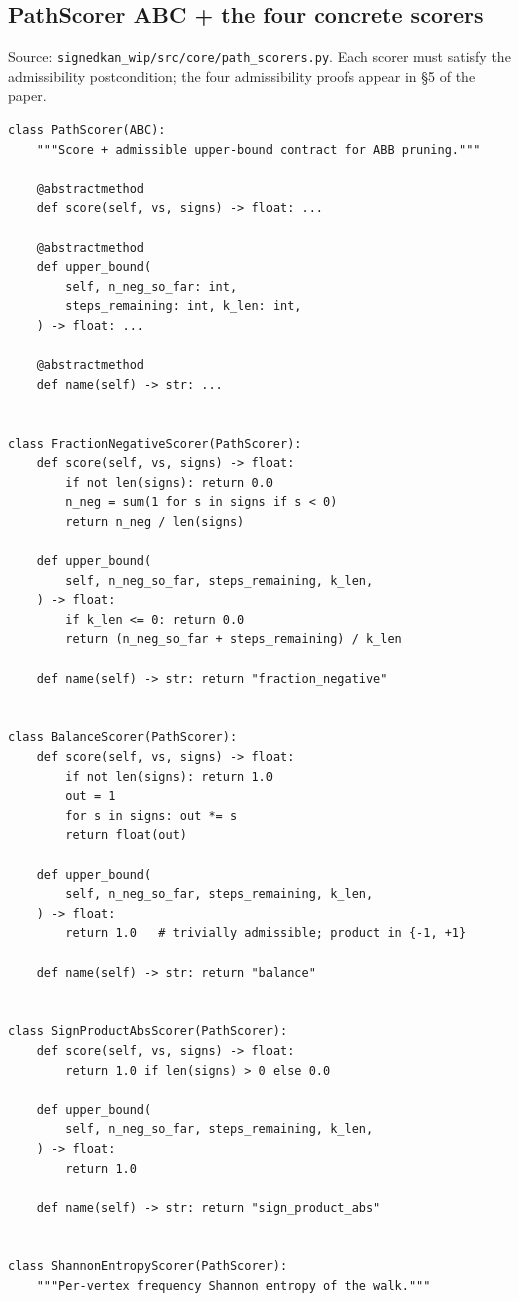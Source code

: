 \documentclass[11pt]{article}
\begin{document}
\subsection{PathScorer ABC + the four concrete scorers}
\label{app:code-scorers}

Source: \texttt{signedkan\_wip/src/core/path\_scorers.py}. Each
scorer must satisfy the admissibility postcondition; the four
admissibility proofs appear in \S5 of the paper.

\begin{lstlisting}[style=pythonstyle]
class PathScorer(ABC):
    """Score + admissible upper-bound contract for ABB pruning."""

    @abstractmethod
    def score(self, vs, signs) -> float: ...

    @abstractmethod
    def upper_bound(
        self, n_neg_so_far: int,
        steps_remaining: int, k_len: int,
    ) -> float: ...

    @abstractmethod
    def name(self) -> str: ...


class FractionNegativeScorer(PathScorer):
    def score(self, vs, signs) -> float:
        if not len(signs): return 0.0
        n_neg = sum(1 for s in signs if s < 0)
        return n_neg / len(signs)

    def upper_bound(
        self, n_neg_so_far, steps_remaining, k_len,
    ) -> float:
        if k_len <= 0: return 0.0
        return (n_neg_so_far + steps_remaining) / k_len

    def name(self) -> str: return "fraction_negative"


class BalanceScorer(PathScorer):
    def score(self, vs, signs) -> float:
        if not len(signs): return 1.0
        out = 1
        for s in signs: out *= s
        return float(out)

    def upper_bound(
        self, n_neg_so_far, steps_remaining, k_len,
    ) -> float:
        return 1.0   # trivially admissible; product in {-1, +1}

    def name(self) -> str: return "balance"


class SignProductAbsScorer(PathScorer):
    def score(self, vs, signs) -> float:
        return 1.0 if len(signs) > 0 else 0.0

    def upper_bound(
        self, n_neg_so_far, steps_remaining, k_len,
    ) -> float:
        return 1.0

    def name(self) -> str: return "sign_product_abs"


class ShannonEntropyScorer(PathScorer):
    """Per-vertex frequency Shannon entropy of the walk."""


\end{lstlisting}
\end{document}
